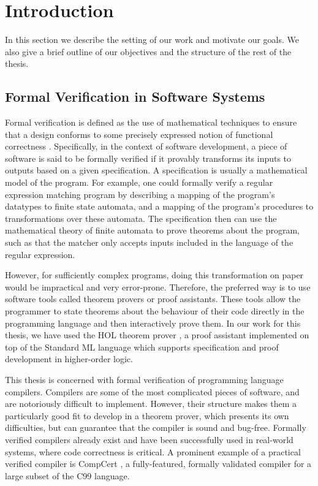 \chapter{Introduction}
\label{chap:intro}

In this section we describe the setting of our work and motivate our goals. We
also give a brief outline of our objectives and the structure of the rest of the
thesis.

\section{Formal Verification in Software Systems}

Formal verification is defined as the use of mathematical techniques to ensure
that a design conforms to some precisely expressed notion of functional
correctness \cite{bjesse2005formal}. Specifically, in the context of software
development, a piece of software is said to be formally verified if it provably
transforms its inputs to outputs based on a given specification. A specification
is usually a mathematical model of the program. For example, one could formally
verify a regular expression matching program by describing a mapping of the
program's datatypes to finite state automata, and a mapping of the program's
procedures to transformations over these automata. The specification then can
use the mathematical theory of finite automata to prove theorems about the
program, such as that the matcher only accepts inputs included in the language
of the regular expression.

However, for sufficiently complex programs, doing this transformation on paper
would be impractical and very error-prone. Therefore, the preferred way is to
use software tools called theorem provers or proof assistants. These tools allow
the programmer to state theorems about the behaviour of their code directly in
the programming language and then interactively prove them. In our work for this
thesis, we have used the HOL theorem prover \cite{HOL4}, a proof assistant
implemented on top of the Standard ML language which supports specification and
proof development in higher-order logic.

This thesis is concerned with formal verification of programming language
compilers. Compilers are some of the most complicated pieces of software, and
are notoriously difficult to implement. However, their structure makes them a
particularly good fit to develop in a theorem prover, which presents its own
difficulties, but can guarantee that the compiler is sound and bug-free.
Formally verified compilers already exist and have been successfully used in
real-world systems, where code correctness is critical. A prominent example of a
practical verified compiler is CompCert \cite{CompCert}, a fully-featured,
formally validated compiler for a large subset of the C99 language.


